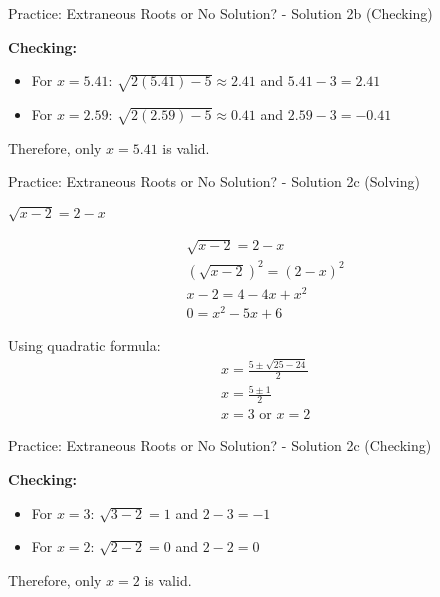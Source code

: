 \documentclass[aspectratio=169]{beamer}
\begin{document}
\begin{frame}{Practice: Extraneous Roots or No Solution? - Solution 2b (Checking)}
\begin{tcolorbox}[colback=lightgray,colframe=primary,title=Solution 2b -- Checking]
\footnotesize
\textbf{Checking:}

\begin{itemize}
  \item For $x = 5.41$: $\sqrt{2(5.41)-5} \approx 2.41$ and $5.41-3 = 2.41$ \checkmark
  \item For $x = 2.59$: $\sqrt{2(2.59)-5} \approx 0.41$ and $2.59-3 = -0.41$ \texttimes
\end{itemize}
Therefore, only $x = 5.41$ is valid.
\end{tcolorbox}
\end{frame}

\begin{frame}{Practice: Extraneous Roots or No Solution? - Solution 2c (Solving)}
\begin{tcolorbox}[colback=lightgray,colframe=primary,title=Solution 2c -- Solving]
\footnotesize
$\sqrt{x-2} = 2-x$

\begin{align*}
  &\sqrt{x-2} = 2-x \\
  &(\sqrt{x-2})^2 = (2-x)^2 \\
  &x-2 = 4-4x+x^2 \\
  &0 = x^2-5x+6
\end{align*}

Using quadratic formula:
\begin{align*}
  &x = \frac{5 \pm \sqrt{25-24}}{2} \\
  &x = \frac{5 \pm 1}{2} \\
  &x = 3 \text{ or } x = 2
\end{align*}
\end{tcolorbox}
\end{frame}

\begin{frame}{Practice: Extraneous Roots or No Solution? - Solution 2c (Checking)}
\begin{tcolorbox}[colback=lightgray,colframe=primary,title=Solution 2c -- Checking]
\footnotesize
\textbf{Checking:}

\begin{itemize}
  \item For $x = 3$: $\sqrt{3-2} = 1$ and $2-3 = -1$ \texttimes
  \item For $x = 2$: $\sqrt{2-2} = 0$ and $2-2 = 0$ \checkmark
\end{itemize}
Therefore, only $x = 2$ is valid.
\end{tcolorbox}
\end{frame}
\end{document}
